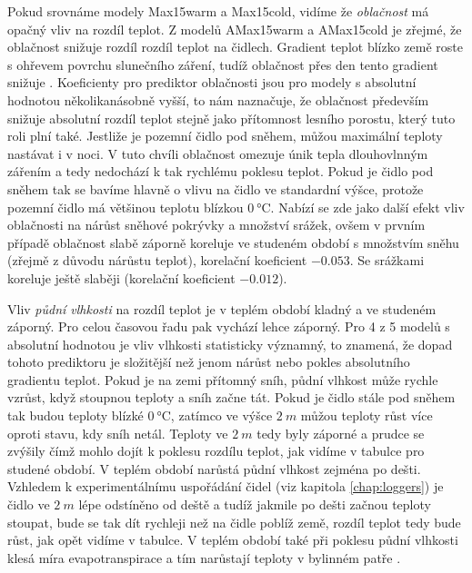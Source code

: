 Pokud srovnáme modely Max15warm a Max15cold, vidíme že \textit{oblačnost} má opačný vliv na rozdíl teplot. Z modelů AMax15warm a AMax15cold je zřejmé, že oblačnost snižuje rozdíl rozdíl teplot na čidlech. Gradient teplot blízko země roste s ohřevem povrchu slunečního záření, tudíž oblačnost přes den tento gradient snižuje \parencite{snow_deFrenneForestMicroclimates, cloud_overwinteringclusters}. Koeficienty pro prediktor oblačnosti jsou pro modely s absolutní hodnotou několikanásobně vyšší, to nám naznačuje, že oblačnost především snižuje absolutní rozdíl teplot stejně jako přítomnost lesního porostu, který tuto roli plní také. Jestliže je pozemní čidlo pod sněhem, můžou maximální teploty nastávat i v noci. V tuto chvíli oblačnost omezuje únik tepla dlouhovlnným zářením a tedy nedochází k tak rychlému poklesu teplot. Pokud je čidlo pod sněhem tak se bavíme hlavně o vlivu na čidlo ve standardní výšce, protože pozemní čidlo má většinou teplotu blízkou $\SI{0}{\celsius}$. Nabízí se zde jako další efekt vliv oblačnosti na nárůst sněhové pokrývky a množství srážek, ovšem v prvním případě oblačnost slabě záporně koreluje ve studeném období s množstvím sněhu (zřejmě z důvodu nárůstu teplot), korelační koeficient $-0.053$. Se srážkami koreluje ještě slaběji (korelační koeficient $-0.012$).

Vliv \textit{půdní vlhkosti} na rozdíl teplot je v teplém období kladný a ve studeném záporný. Pro celou časovou řadu pak vychází lehce záporný. Pro 4 z 5 modelů s absolutní hodnotou je vliv vlhkosti statisticky významný, to znamená, že dopad tohoto prediktoru je složitější než jenom nárůst nebo pokles absolutního gradientu teplot. Pokud je na zemi přítomný sníh, půdní vlhkost může rychle vzrůst, když stoupnou teploty a sníh začne tát. Pokud je čidlo stále pod sněhem tak budou teploty blízké $\SI{0}{\celsius}$, zatímco ve výšce $\SI{2}{m}$ můžou teploty růst více oproti stavu, kdy sníh netál. Teploty ve $\SI{2}{m}$ tedy byly záporné a prudce se zvýšily čímž mohlo dojít k poklesu rozdílu teplot, jak vidíme v tabulce pro studené období. V teplém období narůstá půdní vlhkost zejména po dešti. Vzhledem k experimentálnímu uspořádání čidel (viz kapitola \ref{chap:loggers}) je čidlo ve $\SI{2}{m}$ lépe odstíněno od deště a tudíž jakmile po dešti začnou teploty stoupat, bude se tak dít rychleji než na čidle poblíž země, rozdíl teplot tedy bude růst, jak opět vidíme v tabulce. V teplém období také při poklesu půdní vlhkosti klesá míra evapotranspirace a tím narůstají teploty v bylinném patře \parencite{snow_deFrenneForestMicroclimates}.

